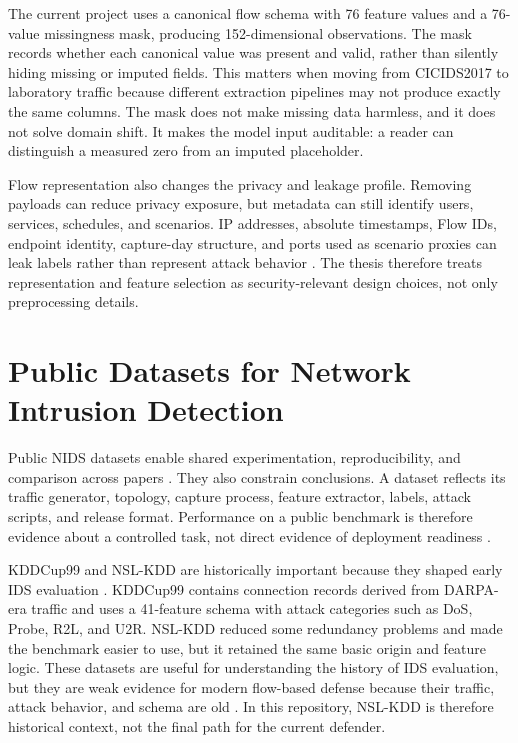 The current project uses a canonical flow schema with 76 feature values and a 76-value missingness mask, producing 152-dimensional observations. The mask records whether each canonical value was present and valid, rather than silently hiding missing or imputed fields. This matters when moving from CICIDS2017 to laboratory traffic because different extraction pipelines may not produce exactly the same columns. The mask does not make missing data harmless, and it does not solve domain shift. It makes the model input auditable: a reader can distinguish a measured zero from an imputed placeholder.

Flow representation also changes the privacy and leakage profile. Removing payloads can reduce privacy exposure, but metadata can still identify users, services, schedules, and scenarios. IP addresses, absolute timestamps, Flow IDs, endpoint identity, capture-day structure, and ports used as scenario proxies can leak labels rather than represent attack behavior \parencite{Arp2020DosDontsMLSecurity,Kaufman2011LeakageDataMining}. The thesis therefore treats representation and feature selection as security-relevant design choices, not only preprocessing details.

\section{Public Datasets for Network Intrusion Detection}

Public NIDS datasets enable shared experimentation, reproducibility, and comparison across papers \parencite{Ring2019DatasetSurvey,Thakkar2020DatasetsReview}. They also constrain conclusions. A dataset reflects its traffic generator, topology, capture process, feature extractor, labels, attack scripts, and release format. Performance on a public benchmark is therefore evidence about a controlled task, not direct evidence of deployment readiness \parencite{Apruzzese2022CrossEvaluationNIDS,Layeghy2023CrossDomainNIDS}.

KDDCup99 and NSL-KDD are historically important because they shaped early IDS evaluation \parencite{KDDCup1999,Tavallaee2009NSLKDD}. KDDCup99 contains connection records derived from DARPA-era traffic and uses a 41-feature schema with attack categories such as DoS, Probe, R2L, and U2R. NSL-KDD reduced some redundancy problems and made the benchmark easier to use, but it retained the same basic origin and feature logic. These datasets are useful for understanding the history of IDS evaluation, but they are weak evidence for modern flow-based defense because their traffic, attack behavior, and schema are old \parencite{Tavallaee2009NSLKDD,Ring2019DatasetSurvey}. In this repository, NSL-KDD is therefore historical context, not the final path for the current defender.

